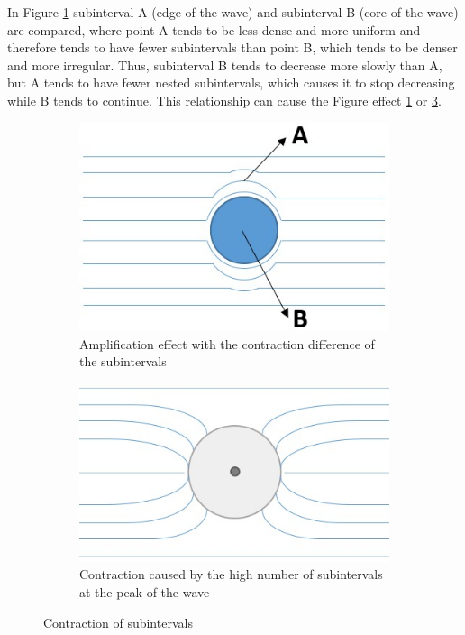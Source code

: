 In Figure \ref{fig:consciousness_space_3D_plan_subinterval_amplify} subinterval A (edge of the wave) and subinterval B (core of the wave) are compared, where point A tends to be less dense and more  uniform and therefore tends to have fewer subintervals than point B, which tends to be denser and more irregular. Thus, subinterval B tends to decrease more slowly than A, but A tends to have fewer nested subintervals, which causes it to stop decreasing while B tends to continue. This relationship can cause the Figure effect \ref{fig:consciousness_space_3D_plan_subinterval_amplify} or \ref{fig:consciousness_space_3D_plan_subinterval_contract}.
	\begin{figure}[H]
	\centering
		\begin{subfigure}[H]{0.65\linewidth}
		\centering
		\includegraphics[width=1\linewidth]{sections/images/consciousness_space_3D_plan_subinterval_amplify.jpg}
		\caption{Amplification effect with the contraction difference of the subintervals}
		\label{fig:consciousness_space_3D_plan_subinterval_amplify}
		\end{subfigure}
	
		\begin{subfigure}[H]{0.65\linewidth}
		\centering
		\includegraphics[width=1\linewidth]{sections/images/consciousness_space_3D_plan_subinterval_contract.jpg}
		\caption{Contraction caused by the high number of subintervals at the peak of the wave}
		\label{fig:consciousness_space_3D_plan_subinterval_contract}
		\end{subfigure}%
	\caption{Contraction of subintervals}
	\end{figure}
	
